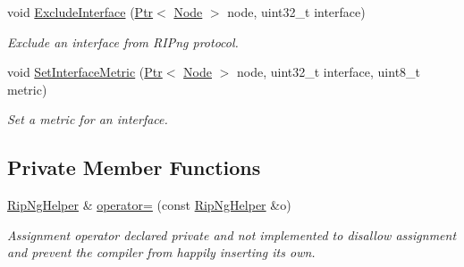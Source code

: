 \begin{DoxyCompactItemize}
void \hyperlink{classns3_1_1RipNgHelper_a4a4dedb275ed4bcdb2772b76c82a3d9c}{Exclude\+Interface} (\hyperlink{classns3_1_1Ptr}{Ptr}$<$ \hyperlink{classns3_1_1Node}{Node} $>$ node, uint32\+\_\+t interface)
\begin{DoxyCompactList}\small\item\em Exclude an interface from R\+I\+Png protocol. \end{DoxyCompactList}\item 
void \hyperlink{classns3_1_1RipNgHelper_a6df4de50669cbe91d0a65746c1fade36}{Set\+Interface\+Metric} (\hyperlink{classns3_1_1Ptr}{Ptr}$<$ \hyperlink{classns3_1_1Node}{Node} $>$ node, uint32\+\_\+t interface, uint8\+\_\+t metric)
\begin{DoxyCompactList}\small\item\em Set a metric for an interface. \end{DoxyCompactList}\end{DoxyCompactItemize}
\subsection*{Private Member Functions}
\begin{DoxyCompactItemize}
\item 
\hyperlink{classns3_1_1RipNgHelper}{Rip\+Ng\+Helper} \& \hyperlink{classns3_1_1RipNgHelper_a9d8fcdc49f19b62ee74e502558575849}{operator=} (const \hyperlink{classns3_1_1RipNgHelper}{Rip\+Ng\+Helper} \&o)
\begin{DoxyCompactList}\small\item\em Assignment operator declared private and not implemented to disallow assignment and prevent the compiler from happily inserting its own. \end{DoxyCompactList}\end{DoxyCompactItemize}
